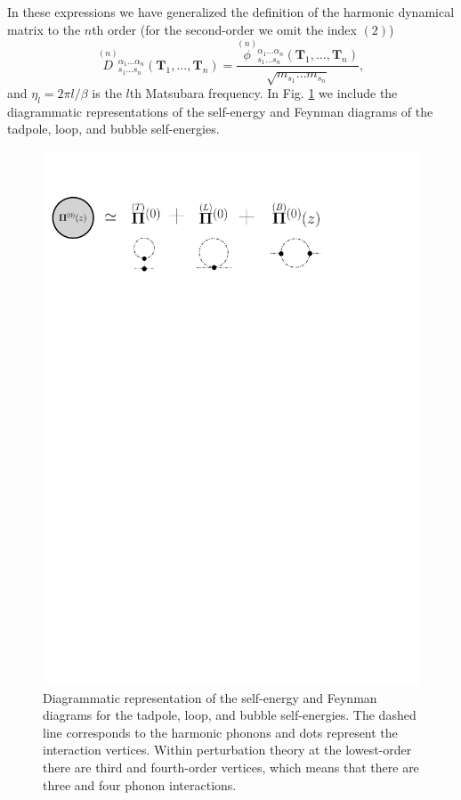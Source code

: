 In these expressions we have generalized the definition of the harmonic dynamical matrix to the $n$th order (for the second-order we omit the index $(2)$)
\begin{equation}
 \overset{(n)}{D}{}_{s_{1}\dots s_{n}}^{\alpha_{1}\dots\alpha_{n}}(\mathbf{T}_{1},\dots,\mathbf{T}_{n})=\frac{\overset{(n)}{\phi}{}_{s_{1}\dots s_{n}}^{\alpha_{1}\dots\alpha_{n}}(\mathbf{T}_{1},\dots,\mathbf{T}_{n})}{\sqrt{
 m_{s_{1}}\dots m_{s_{n}}}},
\end{equation}
and $\eta_{l}=2\pi l/\beta$ is the $l$th Matsubara frequency\cite{maradudin1962scattering}. In Fig. \ref{self-energy-fig} we include the diagrammatic representations of the self-energy and Feynman diagrams of the 
tadpole, loop, and bubble self-energies.
\begin{figure}[h]
\begin{center}
\includegraphics[width=0.95\linewidth]{Figures/self-energy.pdf}
\caption[Diagramtic representation of the self-energy]{Diagrammatic representation of the self-energy and Feynman diagrams for the tadpole, loop, and bubble self-energies. The dashed line corresponds to the harmonic 
phonons and dots represent the interaction vertices. Within perturbation theory at the lowest-order there are third and fourth-order vertices, which means that there are three and four phonon interactions.}
\label{self-energy-fig}
\end{center}
\end{figure}
\\

